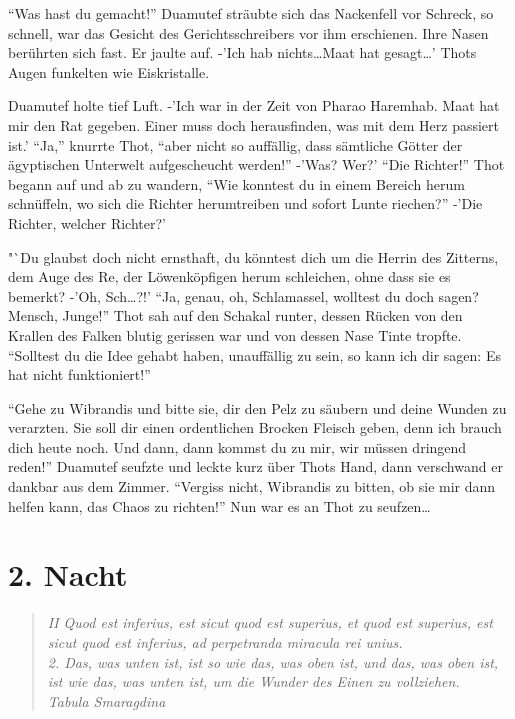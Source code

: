 \documentclass[11pt,titlepage,a5paper]{book}
\begin{document}
 "`Was hast du gemacht!"' Duamutef sträubte sich das Nackenfell vor Schreck, so schnell, war das Gesicht des Gerichtsschreibers vor ihm erschienen. Ihre Nasen berührten sich fast. Er jaulte auf. -'Ich hab nichts\dots Maat hat gesagt\dots' Thots Augen funkelten wie Eiskristalle. 

Duamutef holte tief Luft. -'Ich war in der Zeit von Pharao Haremhab. Maat hat mir den Rat gegeben. Einer muss doch herausfinden, was mit dem Herz passiert ist.' "`Ja,"' knurrte Thot, "`aber nicht so auffällig, dass sämtliche Götter der ägyptischen Unterwelt aufgescheucht werden!"' -'Was? Wer?' "`Die Richter!"' Thot begann auf und ab zu wandern, "`Wie konntest du in einem Bereich herum schnüffeln, wo sich die Richter herumtreiben und sofort Lunte riechen?"' -'Die Richter, welcher Richter?'

 "`Du glaubst doch nicht ernsthaft, du könntest dich um die Herrin des Zitterns, dem Auge des Re, der Löwenköpfigen herum schleichen, ohne dass sie es bemerkt? -'Oh, Sch\dots?!' "`Ja, genau, oh, Schlamassel, wolltest du doch sagen? Mensch, Junge!"' Thot sah auf den Schakal runter, dessen Rücken von den Krallen des Falken blutig gerissen war und von dessen Nase Tinte tropfte. "`Solltest du die Idee gehabt haben, unauffällig zu sein, so kann ich dir sagen: Es hat nicht funktioniert!"'

"`Gehe zu Wibrandis und bitte sie, dir den Pelz zu säubern und deine Wunden zu verarzten. Sie soll dir einen ordentlichen Brocken Fleisch geben, denn ich brauch dich heute noch. Und dann, dann kommst du zu mir, wir müssen dringend reden!"' Duamutef seufzte und leckte kurz über Thots Hand, dann verschwand er dankbar aus dem Zimmer. "`Vergiss nicht, Wibrandis zu bitten, ob sie mir dann helfen kann, das Chaos zu richten!"' Nun war es an Thot zu seufzen\dots

\chapter*{2. Nacht}


\begin{quotation}

\emph{II Quod est inferius, est sicut quod est superius, et quod est superius, est sicut quod est inferius, ad perpetranda miracula rei unius.\\2. Das, was unten ist, ist so wie das, was oben ist, und das, was oben ist, ist wie das, was unten ist, um die Wunder des Einen zu vollziehen. \\Tabula Smaragdina}

\end{quotation}
\end{document}
